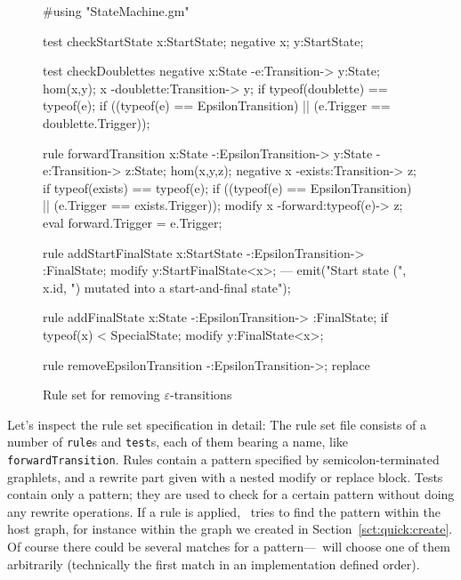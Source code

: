\begin{figure}[htbp]
	\centering
	\begin{grgen}
#using "StateMachine.gm"

test checkStartState {
    x:StartState;
    negative {
        x;
        y:StartState;
    }
}

test checkDoublettes {
    negative {
        x:State -e:Transition-> y:State;
        hom(x,y);
        x -doublette:Transition-> y;
        if {typeof(doublette) == typeof(e);}
        if { ((typeof(e) == EpsilonTransition) || (e.Trigger == doublette.Trigger)); }
    }
}

rule forwardTransition {
    x:State -:EpsilonTransition-> y:State -e:Transition-> z:State;
    hom(x,y,z);
    negative {
        x -exists:Transition-> z;
        if {typeof(exists) == typeof(e);}
        if { ((typeof(e) == EpsilonTransition) || (e.Trigger == exists.Trigger)); }
    }
    modify {
        x -forward:typeof(e)-> z;
        eval {forward.Trigger = e.Trigger;}
    }
}

rule addStartFinalState {
    x:StartState -:EpsilonTransition-> :FinalState;
    modify {
        y:StartFinalState<x>;
    ---
        emit("Start state (", x.id, ") mutated into a start-and-final state");
    }
}

rule addFinalState {
    x:State -:EpsilonTransition-> :FinalState;
    if {typeof(x) < SpecialState;}
    modify {
        y:FinalState<x>;
    }
}

rule removeEpsilonTransition {
    -:EpsilonTransition->;
    replace {}
}
	\end{grgen}
	\caption{Rule set for removing $\varepsilon$-transitions}
	\label{fig:quick:ruleset}
\end{figure}

Let's inspect the rule set specification in detail: The rule set file consists of a number of \texttt{rule}s and \texttt{test}s, each of them bearing a name, like \texttt{forwardTransition}.
Rules contain a pattern specified by semicolon-terminated graphlets, and a rewrite part given with a nested modify or replace block.
Tests contain only a pattern; they are used to check for a certain pattern without doing any rewrite operations.
If a rule is applied, \GrG\ tries to find the pattern within the host graph, for instance within the graph we created in Section~\ref{sct:quick:create}.
Of course there could be several matches for a pattern---\GrG\ will choose one of them arbitrarily (technically the first match in an implementation defined order).

